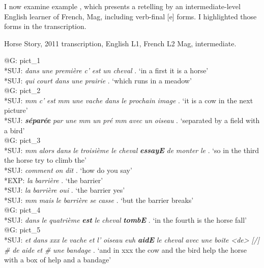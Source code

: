 \documentclass[output=paper,colorlinks,citecolor=brown,modfonts,nonflat]{../langscibook}
\begin{document}
I now examine example , which presents a retelling by an intermediate-level English learner of French, Mag, including verb-final [e] forms. I highlighted those forms in the transcription.

\ea%
    \label{ex:leclerq:1}

         Horse Story, 2011 transcription, English L1, French L2 Mag, intermediate.

@G:  pict\_1\\
*SUJ:  \textit{dans} \textit{une} \textit{première} \textit{c'} \textit{est} \textit{un} \textit{cheval} . ‘in a first it is a horse’\\
*SUJ:   \textit{qui} \textit{court} \textit{dans} \textit{une} \textit{prairie} . ‘which runs in a meadow’\\
@G:  pict\_2\\
*SUJ:  \textit{mm} \textit{c'} \textit{est} \textit{mm} \textit{une} \textit{vache} \textit{dans} \textit{le} \textit{prochain} \textit{image} . ‘it is a cow in the next picture’\\
*SUJ:  \textbf{\textit{séparée} }\textit{par} \textit{une} \textit{mm} \textit{un} \textit{pré} \textit{mm} \textit{avec} \textit{un} \textit{oiseau} . ‘separated by a field with a bird’\\
@G:  pict\_3\\
*SUJ:  \textit{mm} \textit{alors} \textit{dans} \textit{le} \textit{troisième} \textit{le} \textit{cheval} \textbf{\textit{essayE} }\textit{de} \textit{monter} \textit{le} . ‘so in the third the horse try to climb the’\\
*SUJ:  \textit{comment} \textit{on} \textit{dit} . ‘how do you say’\\
 *EXP:  \textit{la} \textit{barrière} . ‘the barrier’\\
*SUJ:  \textit{la} \textit{barrière} \textit{oui} . ‘the barrier yes’\\
*SUJ:  \textit{mm} \textit{mais} \textit{le} \textit{barrière} \textit{se} \textit{casse} . ‘but the barrier breaks’\\
@G:  pict\_4\\
*SUJ:  \textit{dans} \textit{le} \textit{quatrième} \textbf{\textit{est}} \textit{le} \textit{cheval} \textbf{\textit{tombE}} . ‘in the fourth is the horse fall’\\
@G:  pict\_5\\
*SUJ:  \textit{et} \textit{dans} \textit{xxx} \textit{le} \textit{vache} \textit{et} \textit{l'} \textit{oiseau} \textit{euh} \textbf{\textit{aidE} }\textit{le} \textit{cheval} \textit{avec} \textit{une} \textit{boite} \textit{<de>} \textit{[/]} \textit{\#} \textit{de} \textit{aide} \textit{et} \textit{\#} \textit{une} \textit{bandage} . ‘and in xxx the cow and the bird help the horse with a box of help and a bandage’
\z
\end{document}
